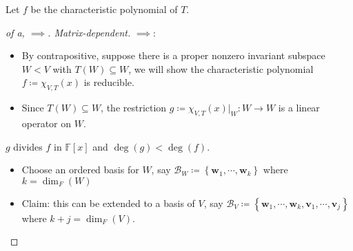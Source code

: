 \begin{solution}

\envlist

Let \(f\) be the characteristic polynomial of \(T\).

\begin{proof}[of a, $\implies$. Matrix-dependent]

\(\implies\):

\begin{itemize}
\tightlist
\item
  By contrapositive, suppose there is a proper nonzero invariant
  subspace \(W<V\) with \(T(W) \subseteq W\), we will show the
  characteristic polynomial \(f \coloneqq\chi_{V, T}(x)\) is reducible.
\item
  Since \(T(W)\subseteq W\), the restriction
  \(g\coloneqq\chi_{V, T}(x) \mathrel{\Big|}_W: W\to W\) is a linear
  operator on \(W\).
\end{itemize}

\begin{claim}

\(g\) divides \(f\) in \({\mathbb{F}}[x]\) and \(\deg(g) < \deg(f)\).

\end{claim}

\begin{itemize}
\item
  Choose an ordered basis for \(W\), say
  \({\mathcal{B}}_W \coloneqq\left\{{\mathbf{w}_1, \cdots, \mathbf{w}_k}\right\}\)
  where \(k=\dim_F(W)\)
\item
  Claim: this can be extended to a basis of \(V\), say
  \({\mathcal{B}}_V \coloneqq\left\{{\mathbf{w}_1, \cdots, \mathbf{w}_k, \mathbf{v}_1, \cdots, \mathbf{v}_j}\right\}\)
  where \(k+j = \dim_F(V)\).


\end{itemize}
\end{proof}
\end{solution}
